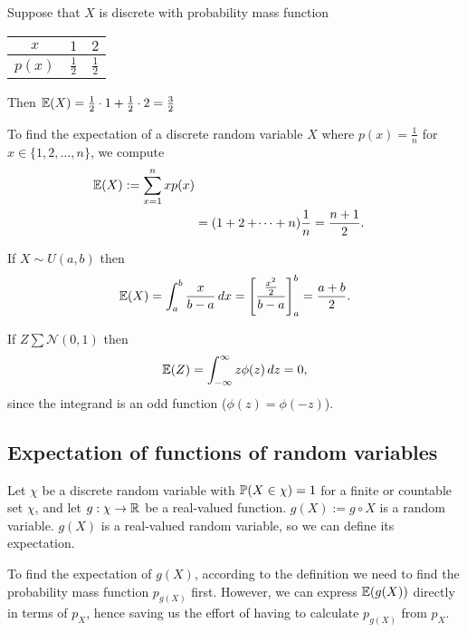 \documentclass[10pt, a4paper]{article}
\begin{document}
\begin{example}
    Suppose that $X$ is discrete with probability mass function
    \begin{table}[]
        \centering
        \begin{tabular}{c|cc}
             $x$ & $1$ & $2$ \\
             \hline
             $p(x)$ & $\frac{1}{2}$ & $\frac{1}{2}$
        \end{tabular}
    \end{table}
    Then $\E(X) = \frac{1}{2} \cdot 1 + \frac{1}{2} \cdot 2 = \frac{3}{2}$
\end{example}

\begin{example}
    To find the expectation of a discrete random variable $X$ where $p(x) = \frac{1}{n}$ for $x \in \{1, 2, \dotsc, n\}$,
    we compute
    \begin{align*}
        \E(X) := \sum_{x = 1}^{n}xp(x) \\
        &= (1 + 2 + \dotsi + n)\frac{1}{n} = \frac{n + 1}{2}.
    \end{align*}
\end{example}

\begin{example}
    If $X \sim U(a, b)$ then
    \[
    \E(X) = \int_a^b\frac{x}{b - a}\,dx = \left[\frac{\frac{x ^ 2}{2}}{b - a}\right]_a^b = \frac{a + b}{2}.
    \]
\end{example}

\begin{example}
    If $Z \sum \mathcal{N}(0, 1)$ then
    \[
    \E(Z) = \int_{-\infty}^{\infty}z\phi(z)\,dz = 0,
    \]
    since the integrand is an odd function
    ($\phi(z) = \phi(-z)$).
\end{example}

\subsection{Expectation of functions of random variables}

Let $\chi$ be a discrete random variable with $\P(X \in \chi) = 1$ for a finite or countable set $\chi$,
and let $g : \chi \rightarrow \R$ be a real-valued function.
$g(X) := g \circ X$ is a random variable.
$g(X)$ is a real-valued random variable,
so we can define its expectation.

To find the expectation of $g(X)$,
according to the definition we need to find the probability mass function $p_{g(X)}$ first.
However,
we can express $\E(g(X))$ directly in terms of $p_X$,
hence saving us the effort of having to calculate $p_{g(X)}$ from $p_X$.
\end{document}
